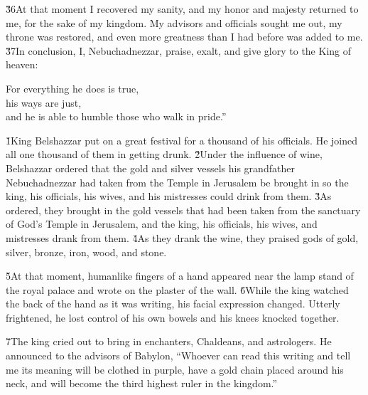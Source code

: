 \v{36}At that moment I recovered my sanity, and my honor and majesty returned to me, for the sake of my kingdom. My advisors and officials sought me out, my throne was restored, and even more greatness than I had before was added to me. \v{37}In conclusion, I, Nebuchadnezzar, praise, exalt, and give glory to the King of heaven:

\begin{poetry}
\poeml For everything he does is true, \\
\poemll    his ways are just, \\
\poemlll       and he is able to humble those who walk in pride.''
\end{poetry}

\v{1}King Belshazzar put on a great festival for a thousand of his officials. He joined all one thousand of them in getting drunk. \v{2}Under the influence of wine, Belshazzar ordered that the gold and silver vessels his grandfather Nebuchadnezzar had taken from the Temple in Jerusalem be brought in so the king, his officials, his wives, and his mistresses could drink from them. \v{3}As ordered, they brought in the gold vessels that had been taken from the sanctuary of God's Temple in Jerusalem, and the king, his officials, his wives, and mistresses drank from them. \v{4}As they drank the wine, they praised gods of gold, silver, bronze, iron, wood, and stone.

\v{5}At that moment, humanlike fingers of a hand appeared near the lamp stand of the royal palace and wrote on the plaster of the wall. \v{6}While the king watched the back of the hand as it was writing, his facial expression changed. Utterly frightened, he lost control of his own bowels and his knees knocked together.

\v{7}The king cried out to bring in enchanters, Chaldeans, and astrologers. He announced to the advisors of Babylon, ``Whoever can read this writing and tell me its meaning will be clothed in purple, have a gold chain placed around his neck, and will become the third highest ruler in the kingdom.''

